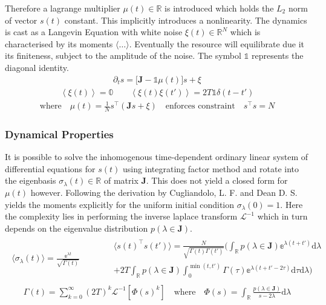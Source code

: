 \documentclass{article}[12pt]
\numberwithin{equation}{section}
\begin{document}
Therefore a lagrange multiplier $\mu(t)\in\mathbb{R}$ is introduced which holds
the $L_2$ norm of vector $s(t)$ constant. This implicitly introduces a nonlinearity.
The dynamics is cast as a Langevin Equation with white noise $\xi(t)\in\mathbb{R}^N$
which is characterised by its moments $\langle\dots\rangle$. Eventually the resource
will equilibrate due it its finiteness, subject to the amplitude of the noise.
The symbol $\mathbb{1}$ represents the diagonal identity.
\begin{align}
  \partial_t s = \big[\mathbf{J}-\mathbb{1}\mu(t)\big]s+\xi
\end{align}
\vspace{-40pt}
\begin{align}
  \left\langle\xi(t)\right\rangle=\mathbb{0}\qquad
  \left\langle\xi(t)\xi(t')\right\rangle=2T\mathbb{1}\delta(t-t')
\end{align}
\vspace{-40pt}
\begin{align}
\text{where}\quad\mu(t) = \frac{1}{N}s^{\top}\left(\mathbf{J}s+\xi\right)
\quad\text{enforces constraint}\quad s^\top\! s=N
\label{eq:constraint}
\end{align}
\subsubsection{Dynamical Properties}
It is possible to solve the inhomogenous time-dependent ordinary linear system of
differential equations for $s(t)$ using integrating factor method and rotate
into the eigenbasis $\sigma_{\lambda}(t)\in\mathbb{R}$ of matrix $\mathbf{J}$. This does not
yield a closed form for $\mu(t)$ however. Following the derivation by Cugliandolo, L. F.
and Dean D. S.~\cite{} yields the moments explicitly for the uniform
initial condition $\sigma_{\lambda}(0)=1$. Here the complexity lies in performing
the inverse laplace transform $\mathcal{L}^{-1}$ which in turn depends on the
eigenvalue distribution $p(\lambda\in\mathbf{J})$.
\begin{align}
  \begin{matrix}
  \langle \sigma_{\lambda}(t)\rangle=
    \frac{\mathbb{e}^{\lambda t}}{\sqrt{\Gamma(t)}}
    &&\qquad
  \begin{matrix}
  \langle s(t)^{\top}\!\!s(t')\rangle=
  \frac{N}{\sqrt{\Gamma(t)\Gamma(t')}}
  \bigg(
  \int_{\mathbb{R}} p(\lambda\in\mathbf{J})\mathbb{e}^{\lambda(t+t')}\mathrm{d}\lambda
  \\+2T
  \int_{\mathbb{R}}p(\lambda\in\mathbf{J})\int_{0}^{\min(t,t')}\!
  \Gamma(\tau)\mathbb{e}^{\lambda(t+t'-2\tau)}
  \mathrm{d}\tau\mathrm{d}\lambda
  \bigg)
  \end{matrix}
  \label{eq:moments}
  \end{matrix}
\end{align}
\vspace{-20pt}
\begin{align}
  \Gamma(t)=
    \sum_{k=0}^{\infty}(2T)^k
    \mathcal{L}^{-1}\left[\Phi(s)^k\right]\quad\text{where}
    \quad
    \Phi(s)=\int_{\mathbb{R}}\frac{p(\lambda\in\mathbf{J})}{s-2\lambda}\mathrm{d}\lambda
    \label{eq:gamma}
\end{align}
\end{document}
